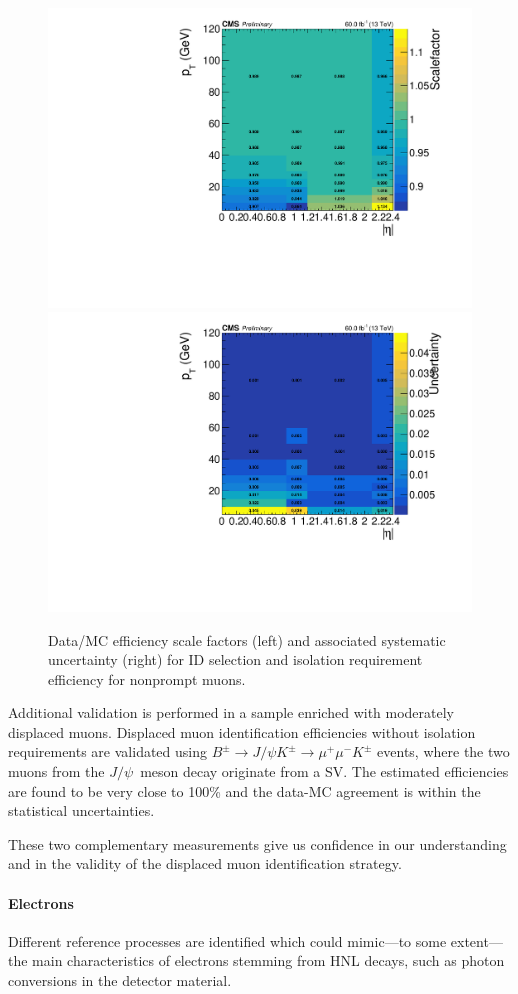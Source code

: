 \begin{figure}[h]
  \centering
 \includegraphics[width=.45\textwidth]{Figures/c6/efficiencies/muons/2018/idiso_nonprompt_sf_2018.pdf}
  \includegraphics[width=.45\textwidth]{Figures/c6/efficiencies/muons/2018/idiso_nonprompt_syst_2018.pdf}
  \caption{Data/MC efficiency scale factors (left) and associated
  systematic uncertainty (right) for ID selection and isolation
  requirement efficiency for nonprompt muons. }
  \label{fig:idiso_muon_nonprompt}
\end{figure}

Additional validation is performed in a sample enriched with moderately
displaced muons. Displaced muon identification efficiencies without
isolation requirements 
are validated using
$B^{\pm}\rightarrow J/\psi K^{\pm}\rightarrow \mu^{+} \mu^{-} K^{\pm}$ events, where the two muons
from the $ J/\psi$~meson decay originate from a SV. The
estimated efficiencies are found to be very close to 100\% and the data-MC
agreement is within the statistical
uncertainties.

These two complementary measurements give us confidence in our understanding
and in the validity of the displaced muon identification strategy.

\paragraph{Electrons}\label{sec:eff_disp_ele}

Different reference processes are identified which could mimic---to
some extent---the main characteristics of \displ electrons 
stemming from HNL decays, such as photon conversions in the
detector material.

